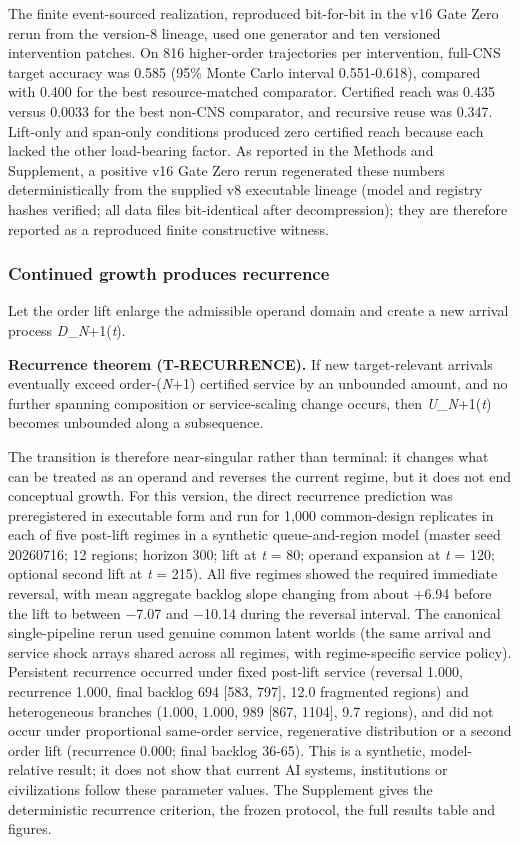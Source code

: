 The finite event-sourced realization, reproduced bit-for-bit in the v16
Gate Zero rerun from the version-8 lineage, used one generator and ten
versioned intervention patches. On 816 higher-order trajectories per
intervention, full-CNS target accuracy was 0.585 (95\% Monte Carlo
interval 0.551-0.618), compared with 0.400 for the best resource-matched
comparator. Certified reach was 0.435 versus 0.0033 for the best non-CNS
comparator, and recursive reuse was 0.347. Lift-only and span-only
conditions produced zero certified reach because each lacked the other
load-bearing factor. As reported in the Methods and Supplement, a
positive v16 Gate Zero rerun regenerated these numbers deterministically
from the supplied v8 executable lineage (model and registry hashes
verified; all data files bit-identical after decompression); they are
therefore reported as a reproduced finite constructive witness.

\hypertarget{continued-growth-produces-recurrence}{%
\subsubsection{Continued growth produces
recurrence}\label{continued-growth-produces-recurrence}}

Let the order lift enlarge the admissible operand domain and create a
new arrival process \emph{D}\_\emph{N}+1(\emph{t}).

\textbf{Recurrence theorem (T-RECURRENCE).} If new target-relevant
arrivals eventually exceed order-(\emph{N}+1) certified service by an
unbounded amount, and no further spanning composition or service-scaling
change occurs, then \emph{U}\_\emph{N}+1(\emph{t}) becomes unbounded
along a subsequence.

The transition is therefore near-singular rather than terminal: it
changes what can be treated as an operand and reverses the current
regime, but it does not end conceptual growth. For this version, the
direct recurrence prediction was preregistered in executable form and
run for 1,000 common-design replicates in each of five post-lift regimes
in a synthetic queue-and-region model (master seed 20260716; 12 regions;
horizon 300; lift at \emph{t} = 80; operand expansion at \emph{t} = 120;
optional second lift at \emph{t} = 215). All five regimes showed the
required immediate reversal, with mean aggregate backlog slope changing
from about +6.94 before the lift to between −7.07 and −10.14 during the
reversal interval. The canonical single-pipeline rerun used genuine
common latent worlds (the same arrival and service shock arrays shared
across all regimes, with regime-specific service policy). Persistent
recurrence occurred under fixed post-lift service (reversal 1.000,
recurrence 1.000, final backlog 694 {[}583, 797{]}, 12.0 fragmented
regions) and heterogeneous branches (1.000, 1.000, 989 {[}867, 1104{]},
9.7 regions), and did not occur under proportional same-order service,
regenerative distribution or a second order lift (recurrence 0.000;
final backlog 36-65). This is a synthetic, model-relative result; it
does not show that current AI systems, institutions or civilizations
follow these parameter values. The Supplement gives the deterministic
recurrence criterion, the frozen protocol, the full results table and
figures.

